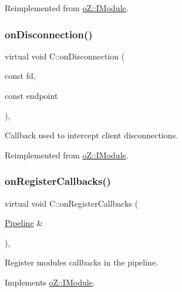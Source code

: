 Reimplemented from \mbox{\hyperlink{classo_z_1_1_i_module_aab3baca66d6f5447376a4d1031f6cc72}{o\+Z\+::\+I\+Module}}.

\mbox{\label{class_c_ab9bef2875c2d19d674aa592f63a21bc1}} 
\subsubsection{\texorpdfstring{onDisconnection()}{onDisconnection()}}
{\footnotesize\ttfamily virtual void C\+::on\+Disconnection (\begin{DoxyParamCaption}\item[{const}]{fd,  }\item[{const}]{endpoint }\end{DoxyParamCaption})\hspace{0.3cm}{\ttfamily [inline]}, {\ttfamily [virtual]}}



Callback used to intercept client disconnections. 



Reimplemented from \mbox{\hyperlink{classo_z_1_1_i_module_aa178220a4e7ba0cca50a131403e04847}{o\+Z\+::\+I\+Module}}.

\mbox{\label{class_c_ae55c5d0571aadf7e48cae4d1e4fcf591}} 
\subsubsection{\texorpdfstring{onRegisterCallbacks()}{onRegisterCallbacks()}}
{\footnotesize\ttfamily virtual void C\+::on\+Register\+Callbacks (\begin{DoxyParamCaption}\item[{\mbox{\hyperlink{classo_z_1_1_pipeline}{Pipeline}} \&}]{ }\end{DoxyParamCaption})\hspace{0.3cm}{\ttfamily [inline]}, {\ttfamily [virtual]}}



Register module\textquotesingle{}s callbacks in the pipeline. 



Implements \mbox{\hyperlink{classo_z_1_1_i_module_a3dc905faa6df5e22eecc6ffbc923fd95}{o\+Z\+::\+I\+Module}}.



